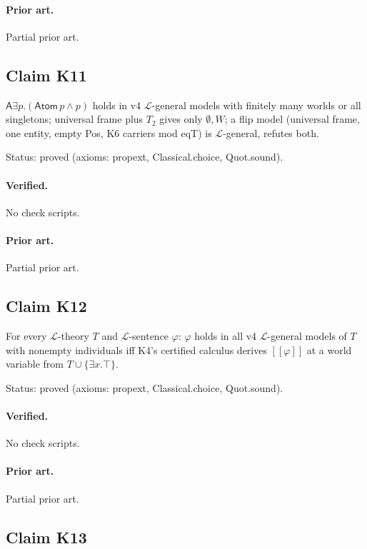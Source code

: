 \documentclass{article}
\begin{document}
\paragraph{Prior art.} Partial prior art.

\subsection*{Claim K11}

$\mathsf A\exists p.(\mathsf{Atom}\,p\wedge p)$ holds in v4 $\mathcal L$-general models with finitely many worlds or all singletons; universal frame plus $T_2$ gives only $\emptyset,W$; a flip model (universal frame, one entity, empty Pos, K6 carriers mod eqT) is $\mathcal L$-general, refutes both.

Status: proved (axioms: propext, Classical.choice, Quot.sound).

\paragraph{Verified.}
No check scripts.

\paragraph{Prior art.} Partial prior art.

\subsection*{Claim K12}

For every $\mathcal L$-theory $T$ and $\mathcal L$-sentence $\varphi$: $\varphi$ holds in all v4 $\mathcal L$-general models of $T$ with nonempty individuals iff K4's certified calculus derives $[\![\varphi]\!]$ at a world variable from $T\cup\{\exists x.\top\}$.

Status: proved (axioms: propext, Classical.choice, Quot.sound).

\paragraph{Verified.}
No check scripts.

\paragraph{Prior art.} Partial prior art.

\subsection*{Claim K13}
\end{document}
